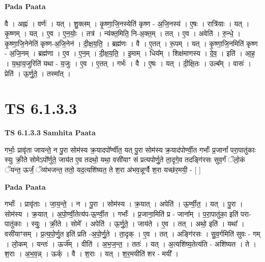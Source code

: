 \documentclass[17pt]{extarticle}
\begin{document}
\textbf{Pada Paata} \newline

वै । अह्नः॑ । वर्णः॑ । यत् । शु॒क्लम् । कृ॒ष्णा॒जि॒नस्येति॑ कृष्ण - अ॒जि॒नस्य॑ । ए॒षः । रात्रि॑याः । यत् । कृ॒ष्णम् । यत् । ए॒व । ए॒न॒योः॒ । तत्र॑ । न्य॑क्त॒मिति॒ नि-अ॒क्त॒म् । तत् । ए॒व । अवेति॑ । रु॒न्धे॒ । कृ॒ष्णा॒जि॒नेनेति॑ कृष्ण-अ॒जि॒नेन॑ । दी॒क्ष॒य॒ति॒ । ब्रह्म॑णः । वै । ए॒तत् । रू॒पम् । यत् । कृ॒ष्णा॒जि॒नमिति॑ कृष्ण - अ॒जि॒नम् । ब्रह्म॑णा । ए॒व । ए॒न॒म् । दी॒क्ष॒य॒ति॒ । इ॒माम् । धिय᳚म् । शिक्ष॑माणस्य । दे॒व॒ । इति॑ । आ॒ह॒ । य॒था॒य॒जुरिति॑ यथा - य॒जुः । ए॒व । ए॒तत् । गर्भः॑ । वै । ए॒षः । यत् । दी॒क्षि॒तः । उल्ब᳚म् । वासः॑ । प्रेति॑ । ऊ॒र्णु॒ते॒ । तस्मा᳚त् ।  \newline





\section{ TS 6.1.3.3 }

\textbf{TS 6.1.3.3 } \newline
\textbf{Samhita Paata} \newline

गर्भाः॒ प्रावृ॑ता जायन्ते॒ न पु॒रा सोम॑स्य क्र॒यादपो᳚र्ण्वीत॒ यत् पु॒रा सोम॑स्य क्र॒याद॑पोर्ण्वी॒त गर्भाः᳚ प्र॒जानां᳚ परा॒पातु॑काः स्युः क्री॒ते सोमेऽपो᳚र्णुते॒ जाय॑त ए॒व तदथो॒ यथा॒ वसी॑याꣳ सं प्रत्यपोर्णु॒ते ता॒दृगे॒व तदङ्गि॑रसः सुव॒र्गं ॅलो॒कं ॅयन्त॒ ऊर्जं॒ ॅव्य॑भजन्त॒ ततो॒ यद॒त्यशि॑ष्यत॒ ते श॒रा अ॑भव॒न्नूर्ग्वै श॒रा यच्छ॑र॒मयी॒ - [  ] \newline

\textbf{Pada Paata} \newline

गर्भाः᳚ । प्रावृ॑ताः । जा॒य॒न्ते॒ । न । पु॒रा । सोम॑स्य । क्र॒यात् । अपेति॑ । ऊ॒र्ण्वी॒त॒ । यत् । पु॒रा । सोम॑स्य । क्र॒यात् । अ॒पो॒र्ण्वी॒तेत्य॑प-ऊ॒र्ण्वी॒त । गर्भाः᳚ । प्र॒जाना॒मिति॑ प्र - जाना᳚म् । प॒रा॒पातु॑का॒ इति॑ परा-पातु॑काः । स्युः॒ । क्री॒ते । सोमे᳚ । अपेति॑ । ऊ॒र्णु॒ते॒ । जाय॑ते । ए॒व । तत् । अथो॒ इति॑ । यथा᳚ । वसी॑याꣳसम् । प्र॒त्य॒पो॒र्णु॒त इति॑ प्रति -अ॒पो॒र्णु॒ते । ता॒दृक् । ए॒व । तत् । अङ्गि॑रसः । सु॒व॒र्गमिति॑ सुवः - गम् । लो॒कम् । यन्तः॑ । ऊर्ज᳚म् । वीति॑ । अ॒भ॒ज॒न्त॒ । ततः॑ । यत् । अ॒त्यशि॑ष्य॒तेत्य॑ति - अशि॑ष्यत । ते । श॒राः । अ॒भ॒व॒न्न् । ऊर्क् । वै । श॒राः । यत् । श॒र॒मयीति॑ शर - मयी᳚ ।  \newline
\end{document}
